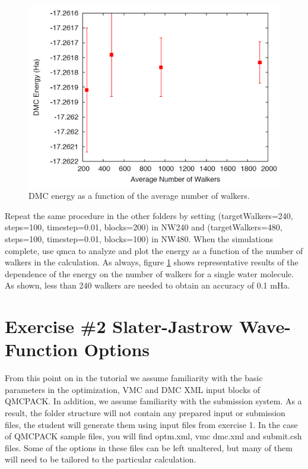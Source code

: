 \begin{figure}
\begin{center}
\includegraphics[trim = 0mm 0mm 0mm 0mm, clip,width=0.75\columnwidth]{figures/lab_advanced_molecules_dmc_popcont.png}
\end{center}
\caption{DMC energy as a function of the average number of walkers.}
\label{fig:lam_dmc_popcont}
\end{figure}

Repeat the same procedure in the other folders by setting (targetWalkers=240,
steps=100, timestep=0.01, blocks=200) in NW240 and (targetWalkers=480, 
steps=100, timestep=0.01, blocks=100) in NW480. When
the simulations complete, use qmca to analyze and plot the energy as a function of the
number of walkers in the calculation. As always, figure \ref{fig:lam_dmc_popcont} 
shows representative results of the
dependence of the energy on the number of walkers for a single water molecule. As shown,
less than 240 walkers are needed to obtain an accuracy of 0.1 mHa.


\section{Exercise \#2 Slater-Jastrow Wave-Function Options}
From this point on in the tutorial we assume familiarity with the basic parameters in the
optimization, VMC and DMC XML input blocks of QMCPACK. In addition, we assume
familiarity with the submission system. As a result, the folder structure will not contain
any prepared input or submission files, the student will generate them using 
input files from exercise 1. In the case of QMCPACK sample 
files, you will find optm.xml, vmc dmc.xml and submit.csh files. Some of
the options in these files can be left unaltered, but many of them will need to be tailored to
the particular calculation.

